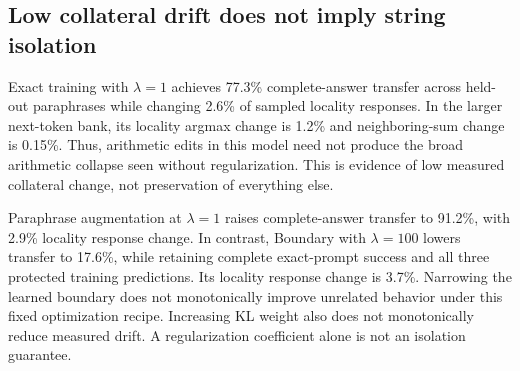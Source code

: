\documentclass[10pt,twocolumn]{article}
\begin{document}
\begin{table}[t]
\centering\small

\caption{Final-layer next-token results at step 80, in percent, averaged over three edit requests and three seeds. Exact, Para., and Dep. measure desired-token argmax. Dep. includes only single-token ordinary/desired labels and is \emph{not} conditioned on base correctness. Local flip and TV cover the full unrelated bank. All rows use the same parameterization; these are objective and regularization comparisons.}
\label{tab:token}
\end{table}

\begin{table}[t]
\centering\small

\caption{Complete-response audit for final-layer edits (percent; means over nine runs per row). Exact, Para., and Dep. require the whole normalized response to match the desired answer. $\dagger$: dependent success restricted to base-correct probes. Changed is whole-response change on the 100-prompt locality sample, not the larger bank from Table~\ref{tab:token}. Repeated digits do not count as correct answers.}
\label{tab:generation}
\end{table}

\subsection{Low collateral drift does not imply string isolation}
Exact training with $\lambda=1$ achieves 77.3\% complete-answer transfer across held-out paraphrases while changing 2.6\% of sampled locality responses. In the larger next-token bank, its locality argmax change is 1.2\% and neighboring-sum change is 0.15\%. Thus, arithmetic edits in this model need not produce the broad arithmetic collapse seen without regularization. This is evidence of low measured collateral change, not preservation of everything else.

Paraphrase augmentation at $\lambda=1$ raises complete-answer transfer to 91.2\%, with 2.9\% locality response change. In contrast, Boundary with $\lambda=100$ lowers transfer to 17.6\%, while retaining complete exact-prompt success and all three protected training predictions. Its locality response change is 3.7\%. Narrowing the learned boundary does not monotonically improve unrelated behavior under this fixed optimization recipe. Increasing KL weight also does not monotonically reduce measured drift. A regularization coefficient alone is not an isolation guarantee.
\end{document}
